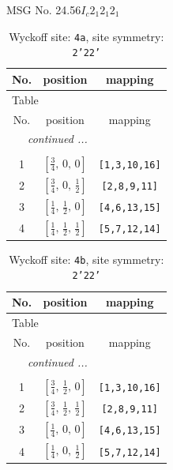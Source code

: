 \documentclass[fleqn,8pt]{jsarticle}
\begin{document}
\setcounter{MaxMatrixCols}{32}

\renewcommand{\tablename}{Table~}
\renewcommand{\figurename}{Figure~}
\begin{center}
\LARGE
MSG No. 24.56\quad$I_{c}2_{1}2_{1}2_{1}$
\end{center}
\renewcommand{\arraystretch}{1.2}
\begin{longtable}{ccc}
\caption{Wyckoff site: {\tt 4a}, site symmetry: {\tt 2'22'}}
 \\
 \hline \hline
No. & position & mapping \\ \hline \endfirsthead

\multicolumn{2}{l}{\tablename\ \thetable{}} \\
 \hline \hline
No. & position & mapping \\ \hline \endhead

 \hline \hline
\multicolumn{2}{r}{\footnotesize\it continued ...} \\ \endfoot

 \hline \hline
\multicolumn{2}{r}{} \\ \endlastfoot

1 & $\left[ \frac{3}{4},\, 0,\, 0 \right]$ & {\tt [1,3,10,16]} \\ \hline
2 & $\left[ \frac{3}{4},\, 0,\, \frac{1}{2} \right]$ & {\tt [2,8,9,11]} \\ \hline
3 & $\left[ \frac{1}{4},\, \frac{1}{2},\, 0 \right]$ & {\tt [4,6,13,15]} \\ \hline
4 & $\left[ \frac{1}{4},\, \frac{1}{2},\, \frac{1}{2} \right]$ & {\tt [5,7,12,14]} \\
\end{longtable}
\renewcommand{\arraystretch}{1.2}
\begin{longtable}{ccc}
\caption{Wyckoff site: {\tt 4b}, site symmetry: {\tt 2'22'}}
 \\
 \hline \hline
No. & position & mapping \\ \hline \endfirsthead

\multicolumn{2}{l}{\tablename\ \thetable{}} \\
 \hline \hline
No. & position & mapping \\ \hline \endhead

 \hline \hline
\multicolumn{2}{r}{\footnotesize\it continued ...} \\ \endfoot

 \hline \hline
\multicolumn{2}{r}{} \\ \endlastfoot

1 & $\left[ \frac{3}{4},\, \frac{1}{2},\, 0 \right]$ & {\tt [1,3,10,16]} \\ \hline
2 & $\left[ \frac{3}{4},\, \frac{1}{2},\, \frac{1}{2} \right]$ & {\tt [2,8,9,11]} \\ \hline
3 & $\left[ \frac{1}{4},\, 0,\, 0 \right]$ & {\tt [4,6,13,15]} \\ \hline
4 & $\left[ \frac{1}{4},\, 0,\, \frac{1}{2} \right]$ & {\tt [5,7,12,14]} \\
\end{longtable}
\end{document}
